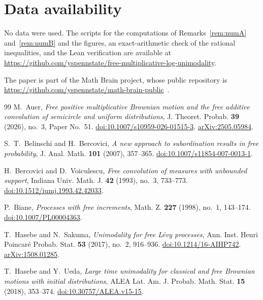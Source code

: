 \documentclass[11pt]{amsart}
\theoremstyle{remark}
\begin{document}
\section*{Data availability}
No data were used. The scripts for the computations of Remarks~\ref{rem:numA} and~\ref{rem:numB} and the figures, an exact-arithmetic check of the rational inequalities, and the Lean verification are available at \url{https://github.com/yspennstate/free-multiplicative-log-unimodality}.

The paper is part of the Math Brain project, whose public repository is \url{https://github.com/yspennstate/math-brain-public}~\cite{MathBrainRepo}.

\begin{thebibliography}{99}
M.~Auer,
\emph{Free positive multiplicative Brownian motion and the free additive convolution of semicircle and uniform distributions},
J. Theoret. Probab. \textbf{39} (2026), no.~3, Paper No.~51.
\href{https://doi.org/10.1007/s10959-026-01515-3}{doi:10.1007/s10959-026-01515-3}.
\href{https://arxiv.org/abs/2505.05984}{arXiv:2505.05984}.

S.~T.~Belinschi and H.~Bercovici,
\emph{A new approach to subordination results in free probability},
J. Anal. Math. \textbf{101} (2007), 357--365.
\href{https://doi.org/10.1007/s11854-007-0013-1}{doi:10.1007/s11854-007-0013-1}.

H.~Bercovici and D.~Voiculescu,
\emph{Free convolution of measures with unbounded support},
Indiana Univ. Math. J. \textbf{42} (1993), no.~3, 733--773.
\href{https://doi.org/10.1512/iumj.1993.42.42033}{doi:10.1512/iumj.1993.42.42033}.

P.~Biane,
\emph{Processes with free increments},
Math. Z. \textbf{227} (1998), no.~1, 143--174.
\href{https://doi.org/10.1007/PL00004363}{doi:10.1007/PL00004363}.

T.~Hasebe and N.~Sakuma,
\emph{Unimodality for free L\'evy processes},
Ann. Inst. Henri Poincar\'e Probab. Stat. \textbf{53} (2017), no.~2, 916--936.
\href{https://doi.org/10.1214/16-AIHP742}{doi:10.1214/16-AIHP742}.
\href{https://arxiv.org/abs/1508.01285}{arXiv:1508.01285}.

T.~Hasebe and Y.~Ueda,
\emph{Large time unimodality for classical and free Brownian motions with initial distributions},
ALEA Lat. Am. J. Probab. Math. Stat. \textbf{15} (2018), 353--374.
\href{https://doi.org/10.30757/ALEA.v15-15}{doi:10.30757/ALEA.v15-15}.


\end{thebibliography}
\end{document}
